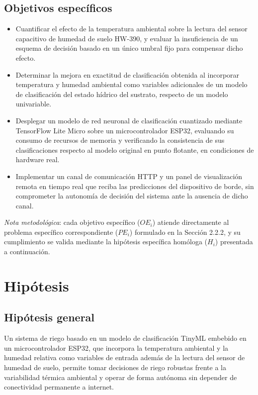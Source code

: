 \documentclass[12pt,a4paper]{article}
\begin{document}
\subsection{Objetivos específicos}
\begin{itemize}
    \item[$OE_1$:] Cuantificar el efecto de la temperatura ambiental sobre la lectura del sensor capacitivo de humedad de suelo HW-390, y evaluar la insuficiencia de un esquema de decisión basado en un único umbral fijo para compensar dicho efecto.
    \item[$OE_2$:] Determinar la mejora en exactitud de clasificación obtenida al incorporar temperatura y humedad ambiental como variables adicionales de un modelo de clasificación del estado hídrico del sustrato, respecto de un modelo univariable.
    \item[$OE_3$:] Desplegar un modelo de red neuronal de clasificación cuantizado mediante TensorFlow Lite Micro sobre un microcontrolador ESP32, evaluando su consumo de recursos de memoria y verificando la consistencia de sus clasificaciones respecto al modelo original en punto flotante, en condiciones de hardware real.
    \item[$OE_4$:] Implementar un canal de comunicación HTTP y un panel de visualización remota en tiempo real que reciba las predicciones del dispositivo de borde, sin comprometer la autonomía de decisión del sistema ante la ausencia de dicho canal.
\end{itemize}

\noindent \textit{Nota metodológica}: cada objetivo específico ($OE_i$) atiende directamente al problema específico correspondiente ($PE_i$) formulado en la Sección 2.2.2, y su cumplimiento se valida mediante la hipótesis específica homóloga ($H_i$) presentada a continuación.

\section{Hipótesis}

\subsection{Hipótesis general}
Un sistema de riego basado en un modelo de clasificación TinyML embebido en un microcontrolador ESP32, que incorpora la temperatura ambiental y la humedad relativa como variables de entrada además de la lectura del sensor de humedad de suelo, permite tomar decisiones de riego robustas frente a la variabilidad térmica ambiental y operar de forma autónoma sin depender de conectividad permanente a internet.
\end{document}
